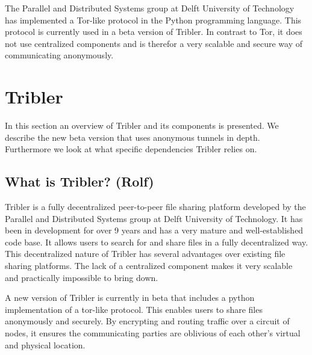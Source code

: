 \documentclass[11pt]{article}
\begin{document}
	The Parallel and Distributed Systems group at Delft University of Technology has implemented a Tor-like protocol in the Python programming language. This protocol is currently used in a beta version of Tribler. In contrast to Tor, it does not use centralized components and is therefor a very scalable and secure way of communicating anonymously.

\section{Tribler}
In this section an overview of Tribler and its components is presented. We describe the new beta version that uses anonymous tunnels in depth. Furthermore we look at what specific dependencies Tribler relies on.

\subsection{What is Tribler? (Rolf)}
Tribler is a fully decentralized peer-to-peer file sharing platform developed by the Parallel and Distributed Systems group at Delft University of Technology. It has been in development for over 9 years and has a very mature and well-established code base. It allows users to search for and share files in a fully decentralized way. This decentralized nature of Tribler has several advantages over existing file sharing platforms. The lack of a centralized component makes it very scalable and practically impossible to bring down.

A new version of Tribler is currently in beta that includes a python implementation of a tor-like protocol. This enables users to share files anonymously and securely. By encrypting and routing traffic over a circuit of nodes, it ensures the communicating parties are oblivious of each other's virtual and physical location.
\end{document}

